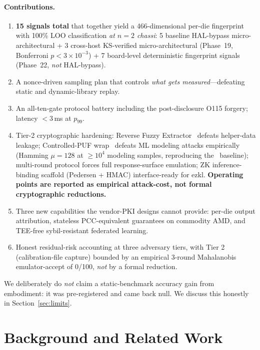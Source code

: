 \documentclass[11pt,letterpaper]{article}
\begin{document}
\paragraph{Contributions.}
\begin{enumerate}[noitemsep,topsep=2pt]
\item \textbf{15 signals total} that together yield a 466-dimensional
      per-die fingerprint with 100\% LOO classification \emph{at $n=2$
      chassi}: 5 baseline HAL-bypass micro-architectural + 3 cross-host
      KS-verified micro-architectural (Phase~19,
      Bonferroni $p < 3{\times}10^{-3}$) + 7 board-level deterministic
      fingerprint signals (Phase~22, \emph{not} HAL-bypass).
\item A nonce-driven sampling plan that controls \emph{what gets
      measured}---defeating static and dynamic-library replay.
\item An all-ten-gate protocol battery including the post-disclosure
      O115 forgery; latency $<3$\,ms at $p_{99}$.
\item Tier-2 cryptographic hardening: Reverse Fuzzy
      Extractor~\cite{VanHerrewege2012} defeats helper-data leakage;
      Controlled-PUF wrap~\cite{Suh2007} defeats ML modeling attacks
      empirically (Hamming $\mu = 128$ at $\geq 10^4$ modeling samples,
      reproducing the~\cite{Ruhrmair2010} baseline); multi-round
      protocol forces full response-surface emulation; ZK
      inference-binding scaffold (Pedersen + HMAC) interface-ready for
      ezkl. \textbf{Operating points are reported as empirical
      attack-cost, not formal cryptographic reductions.}
\item Three new capabilities the vendor-PKI designs cannot provide:
      per-die output attribution, stateless PCC-equivalent guarantees
      on commodity AMD, and TEE-free sybil-resistant federated learning.
\item Honest residual-risk accounting at three adversary tiers, with
      Tier 2 (calibration-file capture) bounded by an empirical 3-round
      Mahalanobis emulator-accept of 0/100, \emph{not} by a formal
      reduction.
\end{enumerate}

We deliberately do \emph{not} claim a static-benchmark accuracy gain
from embodiment: it was pre-registered and came back null. We discuss
this honestly in Section~\ref{sec:limits}.

\section{Background and Related Work}
\end{document}
